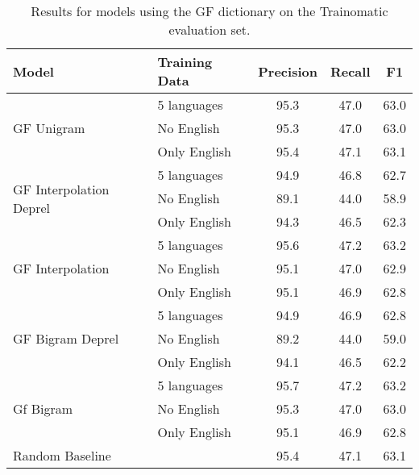 \begin{table}[]
    \centering\begin{tabular}{llccc}
\textbf{Model}  & \textbf{Training Data}        & \textbf{Precision} & \textbf{Recall} & \textbf{F1}     \\
\hline
\multirow{3}{*}{ GF Unigram }             & 5 languages  & 95.3      & 47.0   & 63.0   \\
                                           & No English   & 95.3      & 47.0   & 63.0   \\
                                           & Only English & 95.4      & 47.1   & 63.1   \\
\hline
\multirow{3}{*}{ GF Interpolation Deprel } & 5 languages  & 94.9      & 46.8   & 62.7   \\
                                           & No English   & 89.1      & 44.0   & 58.9   \\
                                           & Only English & 94.3      & 46.5   & 62.3   \\
\hline
\multirow{3}{*}{ GF Interpolation }        & 5 languages  & 95.6      & 47.2   & 63.2   \\
                                           & No English   & 95.1      & 47.0   & 62.9   \\
                                           & Only English & 95.1      & 46.9   & 62.8   \\
\hline
\multirow{3}{*}{ GF Bigram Deprel }       & 5 languages  & 94.9      & 46.9   & 62.8   \\
                                           & No English   & 89.2      & 44.0   & 59.0   \\
                                           & Only English & 94.1      & 46.5   & 62.2   \\
\hline
\multirow{3}{*}{ Gf Bigram }               & 5 languages  & 95.7      & 47.2   & 63.2   \\
                                           & No English   & 95.3      & 47.0   & 63.0   \\
                                           & Only English & 95.1      & 46.9   & 62.8   \\
\hline
\multirow{1}{*}{ Random Baseline } & & 95.4 & 47.1 & 63.1 \\
\end{tabular}

    \caption{Results for models using the GF dictionary on the Trainomatic evaluation set.}
    \label{tab:gf_trainomatic}
\end{table}

